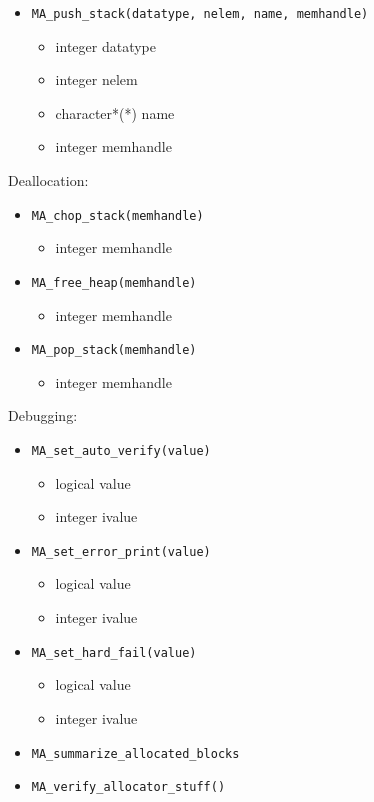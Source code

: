 \begin{itemize}
\item {\tt MA\_push\_stack(datatype, nelem, name, memhandle)}
\begin{itemize}
\item      integer datatype
\item      integer nelem
\item      character*(*) name
\item      integer memhandle
\end{itemize}

\end{itemize}

Deallocation:
\begin{itemize}
\item {\tt MA\_chop\_stack(memhandle)}
\begin{itemize}
\item      integer memhandle
\end{itemize}

\item {\tt MA\_free\_heap(memhandle)}
\begin{itemize}
\item      integer memhandle
\end{itemize}

\item {\tt MA\_pop\_stack(memhandle)}
\begin{itemize}
\item      integer memhandle
\end{itemize}

\end{itemize}

Debugging:
\begin{itemize}
\item {\tt MA\_set\_auto\_verify(value)}
\begin{itemize}
\item      logical value
\item      integer ivalue
\end{itemize}

\item {\tt MA\_set\_error\_print(value)}
\begin{itemize}
\item      logical value
\item      integer ivalue
\end{itemize}

\item {\tt MA\_set\_hard\_fail(value)}
\begin{itemize}
\item      logical value
\item      integer ivalue
\end{itemize}

\item {\tt MA\_summarize\_allocated\_blocks}
\item {\tt MA\_verify\_allocator\_stuff()}
\end{itemize}

